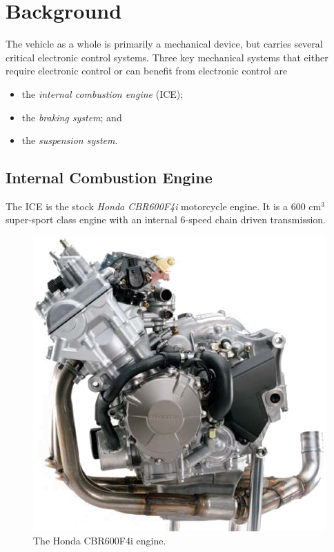%
%
%
%

\chapter{Background}

The vehicle as a whole is primarily a mechanical device, but carries several critical electronic control systems. Three key mechanical systems that either require electronic control or can benefit from electronic control are

\begin{itemize}
\item the \emph{internal combustion engine} (ICE); 
\item the \emph{braking system}; and
\item the \emph{suspension system}.
\end{itemize}

\section{Internal Combustion Engine}
\label{sec:ice_overview}


The ICE is the stock \emph{Honda CBR600F4i} motorcycle engine. It is a 600 cm$^3$ super-sport class engine with an internal 6-speed chain driven transmission. 

\begin{figure}[H]
	\centering
	 	\includegraphics[scale=0.5]{Figures/cbr600f4i_engine.png}
    \caption{The Honda CBR600F4i engine.}
    \label{fig:cbr600f4i_engine}
\end{figure}

